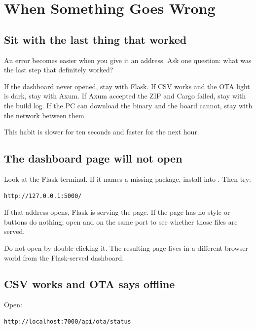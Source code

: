 \chapter{When Something Goes Wrong}

\section{Sit with the last thing that worked}

An error becomes easier when you give it an address. Ask one question: what was the last step that definitely worked?

If the dashboard never opened, stay with Flask. If CSV works and the OTA light is dark, stay with Axum. If Axum accepted the ZIP and Cargo failed, stay with the build log. If the PC can download the binary and the board cannot, stay with the network between them.

This habit is slower for ten seconds and faster for the next hour.

\section{The dashboard page will not open}

Look at the Flask terminal. If it names a missing package, install  into . Then try:

\begin{lstlisting}[numbers=none]
http://127.0.0.1:5000/
\end{lstlisting}

If that address opens, Flask is serving the page. If the page has no style or buttons do nothing, open  and  on the same port to see whether those files are served.

Do not open  by double-clicking it. The resulting  page lives in a different browser world from the Flask-served dashboard.

\section{CSV works and OTA says offline}

Open:

\begin{lstlisting}[numbers=none]
http://localhost:7000/api/ota/status
\end{lstlisting}

